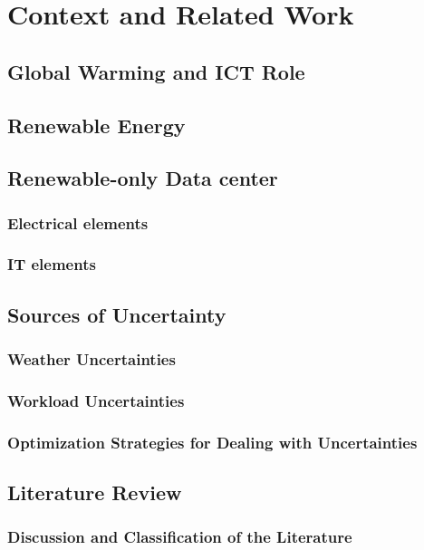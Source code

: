 \chapter{Context and Related Work}
\label{cha:related_work}

\section{Global Warming and ICT Role}

\section{Renewable Energy}

\section{Renewable-only Data center}

\subsection{Electrical elements}

\subsection{IT elements}

\section{Sources of Uncertainty}

\subsection{Weather Uncertainties}

\subsection{Workload Uncertainties}

\subsection{Optimization Strategies for Dealing with Uncertainties}

\section{Literature Review}

\subsection{Discussion and Classification of the Literature}